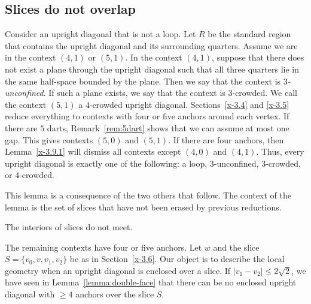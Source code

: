 \subsection{Slices do not overlap} %



\begin{definition}
Consider an upright diagonal that is not a loop. Let $R$ be the
standard region that contains the upright diagonal and its
surrounding quarters.  Assume we are in the context $(4,1)$ or
$(5,1)$.  In the context $(4,1)$, suppose that there does not exist
a plane through the upright diagonal such that all three quarters
lie in the same half-space bounded by the plane. Then we say that
the context is {\it $3$-unconfined}. If such a plane exists, we say
that the context is $3$-crowded. We call the context $(5,1)$ a
$4$-crowded upright diagonal. Sections~\ref{x-3.4} and \ref{x-3.5}
reduce everything to contexts with four or five anchors around each
vertex.  If there are $5$ darts, 
Remark~\ref{rem:5dart} shows that we can assume at most one
gap. This gives contexts $(5,0)$ and $(5,1)$.  If there are four
anchors, then Lemma~\ref{x-3.9.1} will dismiss all contexts except
$(4,0)$ and $(4,1)$. Thus, every upright diagonal is exactly one of
the following: a loop, $3$-unconfined, $3$-crowded, or $4$-crowded.
\end{definition}


This lemma is a consequence of the two others that follow. The
context of the lemma is the set of slices that have
not been erased by previous reductions.

\begin{lemma}
    \label{lemma:anchor-no-overlap}
The interiors of slices do not meet.
\end{lemma}

The remaining contexts have four or  five anchors. Let $w$ and the
slice $S=\{v_0,v,v_1,v_2\}$ be as in Section~\ref{x-3.6}.
Our object is to describe the local geometry when an upright
diagonal is enclosed over a slice. If $|v_1-v_2|\le
2\sqrt{2}$, we have seen in Lemma~\ref{lemma:double-face} that
there can be no enclosed upright diagonal with $\ge 4$ anchors
over the slice $S$.


